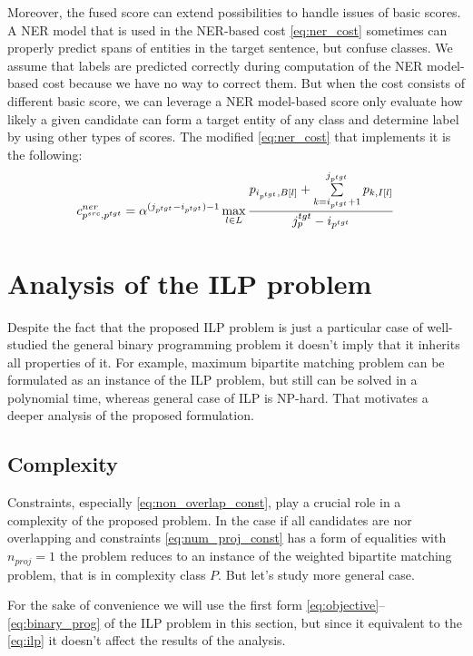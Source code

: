 Moreover, the fused score can extend possibilities to handle issues of basic scores.
A NER model that is used in the NER-based cost \eqref{eq:ner_cost} sometimes can properly
predict spans of entities in the target sentence, but confuse classes.
We assume that labels are predicted correctly during computation of the NER model-based cost because
we have no way to correct them. But when the cost consists of different basic score, we can leverage a
NER model-based score only evaluate how likely a given candidate can form a target entity of any class and
determine label by using other types of scores. The modified \eqref{eq:ner_cost} that implements it
is the following:
\begin{equation} \label{eq:ner_cost_wo_classes}
  c_{p^{src}, p^{tgt}}^{ner} = \alpha^{(j_{p^{tgt}} - i_{p^{tgt}}) - 1}
  \max\limits_{l \in L}
  \frac{
    p_{i_{p^{tgt}}, B[l]} +
    \sum\limits_{k = i_{p^{tgt}} + 1}^{j_{p^{tgt}}} p_{k, I[l]}
  }
  {j_p^{tgt} - i_{p^{tgt}}}
\end{equation}

\section{Analysis of the ILP problem}
Despite the fact that the proposed ILP problem is just a particular case
of well-studied the general binary programming problem it doesn't imply that
it inherits all properties of it. For example, maximum bipartite matching problem
can be formulated as an instance of the ILP problem, but still can be solved in a
polynomial time, whereas general case of ILP is NP-hard. That motivates a deeper analysis
of the proposed formulation.

\subsection{Complexity}
Constraints, especially \eqref{eq:non_overlap_const}, play a crucial role in a complexity
of the proposed problem. In the case if all candidates are nor overlapping and constraints
\eqref{eq:num_proj_const} has a form of equalities with \( n_{proj} = 1 \) the problem reduces to
an instance of the weighted bipartite matching problem, that is in complexity class \( P \). But let's study
more general case.

For the sake of convenience we will use the first form \eqref{eq:objective}--\eqref{eq:binary_prog}
of the ILP problem in this section, but since it equivalent to the \eqref{eq:ilp} it doesn't affect
the results of the analysis.

